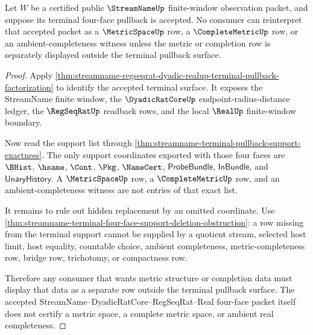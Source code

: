 \begin{theorem}
\label{thm:streamname-terminal-pullback-metric-completion-refusal}
Let $W$ be a certified public $\StreamNameUp$ finite-window observation packet,
and suppose its terminal four-face pullback is accepted. No consumer can
reinterpret that accepted packet as a $\MetricSpaceUp$ row, a
$\CompleteMetricUp$ row, or an ambient-completeness witness unless the
metric or completion row is separately displayed outside the terminal pullback
surface.
\end{theorem}
\begin{proof}
Apply
\autoref{thm:streamname-regseqrat-dyadic-realup-terminal-pullback-factorization}
to identify the accepted terminal surface. It exposes the StreamName finite
window, the $\DyadicRatCoreUp$ endpoint-radius-distance ledger, the
$\RegSeqRatUp$ readback rows, and the local $\RealUp$ finite-window boundary.

Now read the support list through
\autoref{thm:streamname-terminal-pullback-support-exactness}. The only support
coordinates exported with those four faces are $\BHist$, $\hsame$, $\Cont$,
$\Pkg$, $\NameCert$, $\mathsf{ProbeBundle}$, $\mathsf{InBundle}$, and
$\mathsf{UnaryHistory}$. A $\MetricSpaceUp$ row, a $\CompleteMetricUp$ row, and
an ambient-completeness witness are not entries of that exact list.

It remains to rule out hidden replacement by an omitted coordinate. Use
\autoref{thm:streamname-terminal-four-face-support-deletion-obstruction}: a row
missing from the terminal support cannot be supplied by a quotient stream,
selected host limit, host equality, countable choice, ambient completeness,
metric-completeness row, bridge row, trichotomy, or compactness row.

Therefore any consumer that wants metric structure or completion data must
display that data as a separate row outside the terminal pullback surface. The
accepted StreamName--DyadicRatCore--RegSeqRat--Real four-face packet itself
does not certify a metric space, a complete metric space, or ambient real
completeness.
\end{proof}
